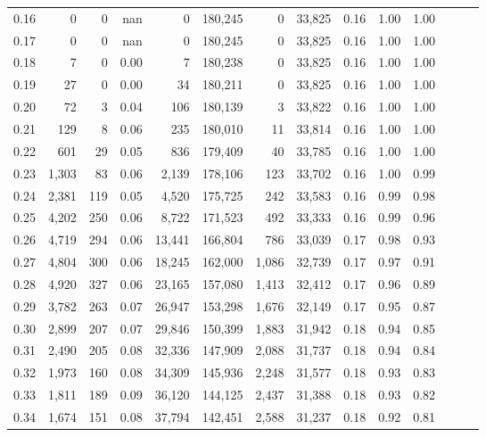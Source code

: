 \begin{tabular}{rrrrrrrrrrrrrr}
0.16 &      0 &      0 &   nan &        0 &  180,245 &       0 &  33,825 &  0.16 &  1.00 &      1.00 \\
0.17 &      0 &      0 &   nan &        0 &  180,245 &       0 &  33,825 &  0.16 &  1.00 &      1.00 \\
0.18 &      7 &      0 &  0.00 &        7 &  180,238 &       0 &  33,825 &  0.16 &  1.00 &      1.00 \\
0.19 &     27 &      0 &  0.00 &       34 &  180,211 &       0 &  33,825 &  0.16 &  1.00 &      1.00 \\
0.20 &     72 &      3 &  0.04 &      106 &  180,139 &       3 &  33,822 &  0.16 &  1.00 &      1.00 \\
0.21 &    129 &      8 &  0.06 &      235 &  180,010 &      11 &  33,814 &  0.16 &  1.00 &      1.00 \\
0.22 &    601 &     29 &  0.05 &      836 &  179,409 &      40 &  33,785 &  0.16 &  1.00 &      1.00 \\
0.23 &  1,303 &     83 &  0.06 &    2,139 &  178,106 &     123 &  33,702 &  0.16 &  1.00 &      0.99 \\
0.24 &  2,381 &    119 &  0.05 &    4,520 &  175,725 &     242 &  33,583 &  0.16 &  0.99 &      0.98 \\
0.25 &  4,202 &    250 &  0.06 &    8,722 &  171,523 &     492 &  33,333 &  0.16 &  0.99 &      0.96 \\
0.26 &  4,719 &    294 &  0.06 &   13,441 &  166,804 &     786 &  33,039 &  0.17 &  0.98 &      0.93 \\
0.27 &  4,804 &    300 &  0.06 &   18,245 &  162,000 &   1,086 &  32,739 &  0.17 &  0.97 &      0.91 \\
0.28 &  4,920 &    327 &  0.06 &   23,165 &  157,080 &   1,413 &  32,412 &  0.17 &  0.96 &      0.89 \\
0.29 &  3,782 &    263 &  0.07 &   26,947 &  153,298 &   1,676 &  32,149 &  0.17 &  0.95 &      0.87 \\
0.30 &  2,899 &    207 &  0.07 &   29,846 &  150,399 &   1,883 &  31,942 &  0.18 &  0.94 &      0.85 \\
0.31 &  2,490 &    205 &  0.08 &   32,336 &  147,909 &   2,088 &  31,737 &  0.18 &  0.94 &      0.84 \\
0.32 &  1,973 &    160 &  0.08 &   34,309 &  145,936 &   2,248 &  31,577 &  0.18 &  0.93 &      0.83 \\
0.33 &  1,811 &    189 &  0.09 &   36,120 &  144,125 &   2,437 &  31,388 &  0.18 &  0.93 &      0.82 \\
0.34 &  1,674 &    151 &  0.08 &   37,794 &  142,451 &   2,588 &  31,237 &  0.18 &  0.92 &      0.81 \\

\end{tabular}
